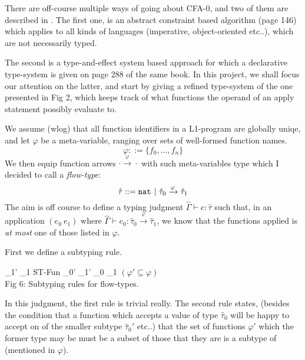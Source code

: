 There are off-course multiple ways of going about CFA-0, and two of them are
described in \cite{PoPA}.
The first one, is an abstract constraint based algorithm (page 146)
which applies to all kinds of languages (imperative, object-oriented etc..),
which are not necessarily typed.

The second is a type-and-effect system based approach for which a declarative
type-system is given on page 288 of the same book.
In this project, we shall focus our attention on the latter,
and start by giving a refined type-system of the one presented in Fig 2,
which keeps track of what functions the operand of an apply statement possibly
evaluate to.

We assume (wlog) that all function identifiers in a L1-program are globally
uniqe, and let $\varphi$ be a meta-variable,
ranging over sets of well-formed function names.
\[ \varphi ::= \{f_0, \dots, f_n \} \]
We then equip function arrows $\cdot \xrightarrow{\varphi} \cdot$ with such
meta-variables type which I decided to call a {\it flow-type}:
\[\hat\tau ::= {\tt nat} \ |\  \hat\tau_0 \xrightarrow{\varphi} \hat\tau_1 \]
The aim is off course to define a typing judgment $\hat\Gamma \vdash e : \hat\tau$
such that, in an application $(e_0\ e_1)$ where
$\hat\Gamma \vdash e_0 : \hat\tau_0 \xrightarrow{\varphi} \hat\tau_1$,
we know that the functions applied is {\it at most} one of those listed
in $\varphi$.

\newpage
First we define a subtyping rule.

\begin{center}
   { \preceq {}}
                  {\hat\tau_1' \preceq \hat\tau_1}
         {ST-Fun} {\hat\tau_0'  \xrightarrow{\varphi}  \hat\tau_1' \preceq
                   \hat\tau_0  \hat\tau_1}
                  $\left( \varphi' \subseteq \varphi \right)$\\
\vspace{.5cm} Fig 6: Subtyping rules for flow-types.
\end{center}
In this judgment, the first rule is trivial really.
The second rule states,
(besides the condition that a function which accepts a value of type $\hat\tau_0$
will be happy to accept on of the smaller subtype $\hat\tau_0'$ etc..)
that the set of functions $\varphi'$ which the former type may be
must be a subset of those that they are is a subtype of (mentioned in $\varphi$).

